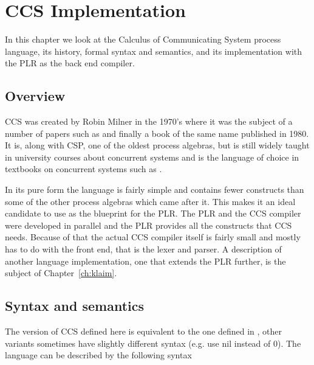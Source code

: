 \chapter{CCS Implementation}\label{ch:ccs_implementation}

	In this chapter we look at the Calculus of Communicating System process 
	language, its history, formal syntax and semantics, and its implementation 
	with the PLR as the back end compiler. 
	
\section{Overview}

	CCS was created by Robin Milner in the 1970's where it was the subject of a 
	number of papers such as \cite{milner1,milner2,milner3} and finally a book 
	of the same name \cite{Milner80} published in 1980. It is, along with CSP, 
	one of the oldest process algebras, but is still widely taught in university 
	courses about concurrent systems and is the language of choice in textbooks 
	on concurrent systems such as \cite{reactive}. 
	
	In its pure form the language is fairly simple and contains fewer constructs 
	than some of the other process algebras which came after it. This makes it 
	an ideal candidate to use as the blueprint for the PLR. The PLR and the CCS 
	compiler were developed in parallel and the PLR provides all the constructs 
	that CCS needs. Because of that the actual CCS compiler itself is fairly 
	small and mostly has to do with the front end, that is the lexer and parser. 
	A description of another language implementation, one that extends the PLR 
	further, is the subject of Chapter~\ref{ch:klaim}.
	
\section{Syntax and semantics}\label{sec:ccs_syntax}

	The version of CCS defined here is equivalent to the one defined in 
	\cite{reactive}, other variants sometimes have slightly different syntax 
	(e.g. use \textsf{nil} instead of 0). The language can be described by the 
	following syntax

